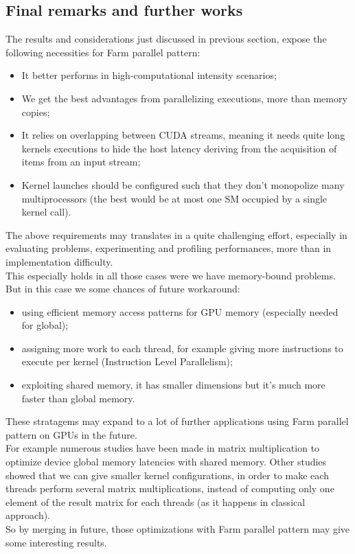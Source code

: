  


\subsection{Final remarks and further works}
The results and considerations just discussed in previous section, expose the following necessities for Farm parallel pattern: 
\begin{itemize}
	\item It better performs in high-computational intensity scenarios;
	\item We get the best advantages from parallelizing executions, more than memory copies;
	\item It relies on overlapping between CUDA streams, meaning it needs quite long kernels executions to hide the host latency deriving from the acquisition of items from an input stream;
	\item Kernel launches should be configured such that they don't monopolize many multiprocessors (the best would be at most one SM occupied by a single kernel call). 
\end{itemize}
The above requirements may translates in a quite challenging effort, especially in evaluating problems, experimenting and profiling performances, more than in implementation difficulty.\\
This especially holds in all those cases were we have memory-bound problems. But in this case we some chances of future workaround:
\begin{itemize}
	\item using efficient memory access patterns for GPU memory (especially needed for global);
	\item assigning more work to each thread, for example giving more instructions to execute per kernel (Instruction Level Parallelism)\cite{cudabestpractices,loweroccupancy};
	\item exploiting shared memory, it has smaller dimensions but it's much more faster than global memory.
\end{itemize} 
These stratagems may expand to a lot of further applications using Farm parallel pattern on GPUs in the future.\\
For example numerous studies have been made in matrix multiplication to optimize device global memory latencies with shared memory.
Other studies showed that we can give smaller kernel configurations, in order to make each threads perform several matrix multiplications\cite{loweroccupancy}, instead of computing only one element of the result matrix for each threads (as it happens in classical approach).\\
So by merging in future, those optimizations with Farm parallel pattern may give some interesting results.\\


